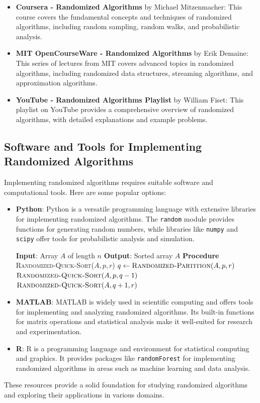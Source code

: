 \documentclass[12pt]{book} %
\begin{document}
\begin{itemize}
    \item \textbf{Coursera - Randomized Algorithms} by Michael Mitzenmacher: This course covers the fundamental concepts and techniques of randomized algorithms, including random sampling, random walks, and probabilistic analysis.
    
    \item \textbf{MIT OpenCourseWare - Randomized Algorithms} by Erik Demaine: This series of lectures from MIT covers advanced topics in randomized algorithms, including randomized data structures, streaming algorithms, and approximation algorithms.
    
    \item \textbf{YouTube - Randomized Algorithms Playlist} by William Fiset: This playlist on YouTube provides a comprehensive overview of randomized algorithms, with detailed explanations and example problems.
\end{itemize}

\subsection{Software and Tools for Implementing Randomized Algorithms}
Implementing randomized algorithms requires suitable software and computational tools. Here are some popular options:

\begin{itemize}
    \item \textbf{Python}: Python is a versatile programming language with extensive libraries for implementing randomized algorithms. The \texttt{random} module provides functions for generating random numbers, while libraries like \texttt{numpy} and \texttt{scipy} offer tools for probabilistic analysis and simulation.
    
    \FloatBarrier
    \begin{algorithm}[H]
    \caption{Randomized Quick Sort}
    \begin{algorithmic}[1]
    \State \textbf{Input}: Array $A$ of length $n$
    \State \textbf{Output}: Sorted array $A$
    \State
    \State \textbf{Procedure} \textsc{Randomized-Quick-Sort}($A, p, r$)
    \State $q \leftarrow \textsc{Randomized-Partition}(A, p, r)$
    \State $\textsc{Randomized-Quick-Sort}(A, p, q-1)$
    \State $\textsc{Randomized-Quick-Sort}(A, q+1, r)$
    \EndIf
    \end{algorithmic}
    \end{algorithm}
    \FloatBarrier
    
    \item \textbf{MATLAB}: MATLAB is widely used in scientific computing and offers tools for implementing and analyzing randomized algorithms. Its built-in functions for matrix operations and statistical analysis make it well-suited for research and experimentation.
    
    \item \textbf{R}: R is a programming language and environment for statistical computing and graphics. It provides packages like \texttt{randomForest} for implementing randomized algorithms in areas such as machine learning and data analysis.
\end{itemize}

These resources provide a solid foundation for studying randomized algorithms and exploring their applications in various domains.
\end{document}

